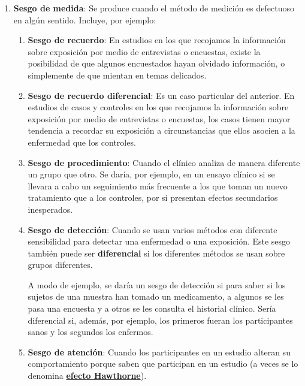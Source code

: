 \documentclass[
]{book}
\theoremstyle{definition}
\theoremstyle{definition}
\theoremstyle{definition}
\theoremstyle{definition}
\theoremstyle{remark}
\begin{document}
\begin{enumerate}
\def\labelenumi{\arabic{enumi}.}
\setcounter{enumi}{1}
\item
  \textbf{Sesgo de medida}: Se produce cuando el método de medición es defectuoso en algún sentido. Incluye, por ejemplo:

  \begin{enumerate}
  \def\labelenumii{\alph{enumii}.}
  \item
    \textbf{Sesgo de recuerdo}: En estudios en los que recojamos la información sobre exposición por medio de entrevistas o encuestas, existe la posibilidad de que algunos encuestados hayan olvidado información, o simplemente de que mientan en temas delicados.
  \item
    \textbf{Sesgo de recuerdo diferencial}: Es un caso particular del anterior. En estudios de casos y controles en los que recojamos la información sobre exposición por medio de entrevistas o encuestas, los casos tienen mayor tendencia a recordar su exposición a circunstancias que ellos asocien a la enfermedad que los controles.
  \item
    \textbf{Sesgo de procedimiento}: Cuando el clínico analiza de manera diferente un grupo que otro. Se daría, por ejemplo, en un ensayo clínico si se llevara a cabo un seguimiento más frecuente a los que toman un nuevo tratamiento que a los controles, por si presentan efectos secundarios inesperados.
  \item
    \textbf{Sesgo de detección}: Cuando se usan varios métodos con diferente sensibilidad para detectar una enfermedad o una exposición. Este sesgo también puede ser \textbf{diferencial} si los diferentes métodos se usan sobre grupos diferentes.

    A modo de ejemplo, se daría un sesgo de detección si para saber si los sujetos de una muestra han tomado un medicamento, a algunos se les pasa una encuesta y a otros se les consulta el historial clínico. Sería diferencial si, además, por ejemplo, los primeros fueran los participantes sanos y los segundos los enfermos.
  \item
    \textbf{Sesgo de atención}: Cuando los participantes en un estudio alteran su comportamiento porque saben que participan en un estudio (a veces se lo denomina \href{https://es.wikipedia.org/wiki/Efecto_Hawthorne}{\textbf{efecto Hawthorne}}).


\end{enumerate}
\end{enumerate}
\end{document}
